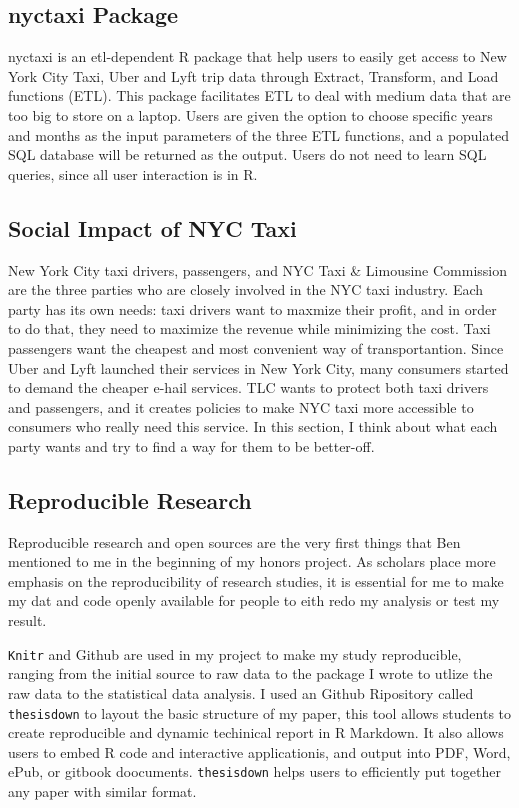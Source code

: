 \documentclass[12pt,twoside]{reedthesis}
\theoremstyle{definition}
\theoremstyle{definition}
\theoremstyle{definition}
\theoremstyle{remark}
\begin{document}
\subsection{nyctaxi Package}\label{nyctaxi-package}

nyctaxi is an etl-dependent R package that help users to easily get
access to New York City Taxi, Uber and Lyft trip data through Extract,
Transform, and Load functions (ETL). This package facilitates ETL to
deal with medium data that are too big to store on a laptop. Users are
given the option to choose specific years and months as the input
parameters of the three ETL functions, and a populated SQL database will
be returned as the output. Users do not need to learn SQL queries, since
all user interaction is in R.

\subsection{Social Impact of NYC Taxi}\label{social-impact-of-nyc-taxi}

New York City taxi drivers, passengers, and NYC Taxi \& Limousine
Commission are the three parties who are closely involved in the NYC
taxi industry. Each party has its own needs: taxi drivers want to
maxmize their profit, and in order to do that, they need to maximize the
revenue while minimizing the cost. Taxi passengers want the cheapest and
most convenient way of transportantion. Since Uber and Lyft launched
their services in New York City, many consumers started to demand the
cheaper e-hail services. TLC wants to protect both taxi drivers and
passengers, and it creates policies to make NYC taxi more accessible to
consumers who really need this service. In this section, I think about
what each party wants and try to find a way for them to be better-off.

\subsection{Reproducible Research}\label{reproducible-research}

Reproducible research and open sources are the very first things that
Ben mentioned to me in the beginning of my honors project. As scholars
place more emphasis on the reproducibility of research studies, it is
essential for me to make my dat and code openly available for people to
eith redo my analysis or test my result.

\texttt{Knitr} and Github are used in my project to make my study
reproducible, ranging from the initial source to raw data to the package
I wrote to utlize the raw data to the statistical data analysis. I used
an Github Ripository called \texttt{thesisdown} to layout the basic
structure of my paper, this tool allows students to create reproducible
and dynamic techinical report in R Markdown. It also allows users to
embed R code and interactive applicationis, and output into PDF, Word,
ePub, or gitbook doocuments. \texttt{thesisdown} helps users to
efficiently put together any paper with similar format.
\end{document}
